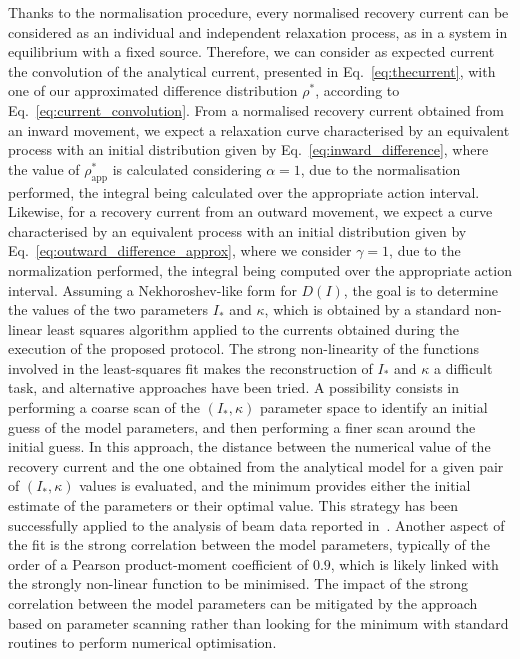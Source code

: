 Thanks to the normalisation procedure, every normalised recovery current can be considered as an individual and independent relaxation process, as in a system in equilibrium with a fixed source. Therefore, we can consider as expected current the convolution of the analytical current, presented in Eq.~\eqref{eq:thecurrent}, with one of our approximated difference distribution $\rho^\ast$, {according to Eq.~\eqref{eq:current_convolution}}. From a normalised recovery current obtained from an inward movement, we expect a relaxation curve characterised by an equivalent process with an initial distribution given by Eq.~\eqref{eq:inward_difference}, where the value of $\rho^\ast_\text{app}$ is calculated considering $\alpha=1$, due to the normalisation performed, the integral being calculated over the appropriate action interval. Likewise, for a recovery current from an outward movement, we expect a curve characterised by an equivalent process with an initial distribution given by Eq.~\eqref{eq:outward_difference_approx}, where we consider $\gamma=1$, due to the normalization performed, the integral being computed over the appropriate action interval. Assuming a Nekhoroshev-like form for $D(I)$, the goal is to determine the values of the two parameters $I_\ast$ and $\kappa$, which is obtained by a standard non-linear least squares algorithm applied to the currents obtained during the execution of the proposed protocol. {The strong non-linearity of the functions involved in the least-squares fit makes the reconstruction of $I_\ast$ and $\kappa$ a difficult task, and alternative approaches have been tried. A possibility consists in performing a coarse scan of the $(I_\ast, \kappa)$ parameter space to identify an initial guess of the model parameters, and then performing a finer scan around the initial guess. In this approach, the distance between the numerical value of the recovery current and the one obtained from the analytical model for a given pair of $(I_\ast, \kappa)$ values is evaluated, and the minimum provides either the initial estimate of the parameters or their optimal value. This strategy has been successfully applied to the analysis of beam data reported in~\cite{montanari:ipac22-mopost043}. Another aspect of the fit is the strong correlation between the model parameters, typically of the order of a Pearson product-moment coefficient of $0.9$, which is likely linked with the strongly non-linear function to be minimised. The impact of the strong correlation between the model parameters can be mitigated by the approach based on parameter scanning rather than looking for the minimum with standard routines to perform numerical optimisation.}

